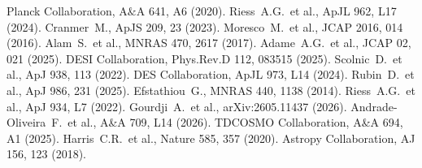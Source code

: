 \documentclass[twocolumn]{aastex631}
\begin{document}
\begin{thebibliography}{}
 Planck Collaboration, A$\&$A 641, A6 (2020).
 Riess~A.G.\ et al., ApJL 962, L17 (2024).
 Cranmer~M., ApJS 209, 23 (2023).
 Moresco~M.\ et al., JCAP 2016, 014 (2016).
 Alam~S.\ et al., MNRAS 470, 2617 (2017).
 Adame~A.G.\ et al., JCAP 02, 021 (2025).
 DESI Collaboration, Phys.Rev.D 112, 083515 (2025).
 Scolnic~D.\ et al., ApJ 938, 113 (2022).
 DES Collaboration, ApJL 973, L14 (2024).
 Rubin~D.\ et al., ApJ 986, 231 (2025).
 Efstathiou~G., MNRAS 440, 1138 (2014).
 Riess~A.G.\ et al., ApJ 934, L7 (2022).
 Gourdji~A.\ et al., arXiv:2605.11437 (2026).
 Andrade-Oliveira~F.\ et al., A\&A 709, L14 (2026).
 TDCOSMO Collaboration, A\&A 694, A1 (2025).
 Harris~C.R.\ et al., Nature 585, 357 (2020).
 Astropy Collaboration, AJ 156, 123 (2018).
\end{thebibliography}
\end{document}

